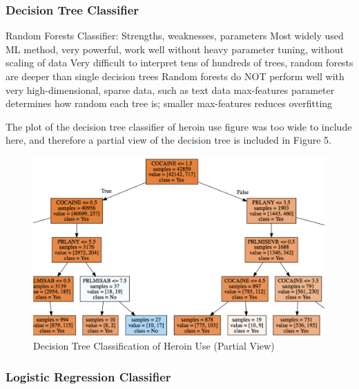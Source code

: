 \documentclass[sigconf]{acmart}
\begin{document}
\cite{raschka17}

\subsubsection{Decision Tree Classifier\cite{muller17}}

Random Forests Classifier: Strengths, weaknesses, parameters
Most widely used ML method, very powerful, work well without heavy parameter tuning, without scaling of data
Very difficult to interpret tens of hundreds of trees, random forests are deeper than single decision trees
Random forests do NOT perform well with very high-dimensional, sparse data, such as text data
max-features parameter determines how random each tree is; smaller max-features reduces overfitting

The plot of the decision tree classifier of heroin use figure was too wide
to include here, and therefore a partial view of the decision tree is included
in Figure 5.

\begin{figure}[!ht]
  \centering\includegraphics[width=\columnwidth]{images/Figure5.pdf}
  \caption{Decision Tree Classification of Heroin Use (Partial View)}
  \label{f:Figure5}
\end{figure}

\subsubsection{Logistic Regression Classifier\cite{muller17}}
\end{document}
